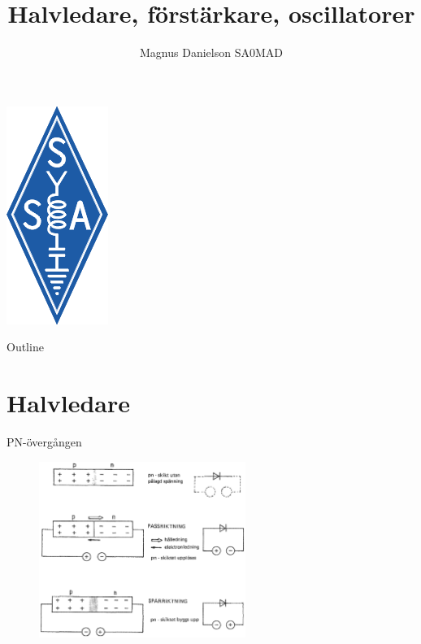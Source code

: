 \documentclass{beamer}
\title{Halvledare, förstärkare, oscillatorer}
\author{Magnus Danielson SA0MAD}
\begin{document}
\begin{frame}
\titlepage
\includegraphics[height=0.3\textheight]{images/ssalogo}
\end{frame}

\begin{frame}{Outline}
\tableofcontents
\end{frame}

\section{Halvledare}

\begin{frame}{PN-övergången}

\begin{figure}[h]
\includegraphics[width=0.6\textwidth]{images/cropped_pdfs/bild_2_2-12.pdf}
\label{fig:BildII1-16}
\end{figure}
\end{frame}
\end{document}
